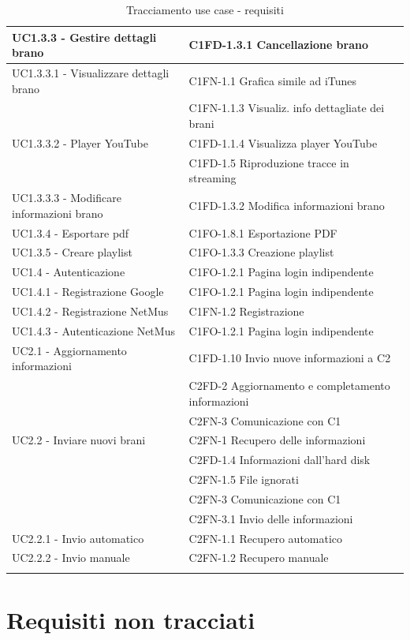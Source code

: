\begin{footnotesize}
\begin{longtable}[!h]{|l|l|}
UC1.3.3 - Gestire dettagli brano & C1FD-1.3.1 Cancellazione brano \\ \hline
UC1.3.3.1 - Visualizzare dettagli brano & C1FN-1.1 Grafica simile ad iTunes \\
& C1FN-1.1.3 Visualiz. info dettagliate dei brani \\ \hline
UC1.3.3.2 - Player YouTube & C1FD-1.1.4 Visualizza player YouTube \\
& C1FD-1.5 Riproduzione tracce in streaming \\ \hline
UC1.3.3.3 - Modificare informazioni brano & C1FD-1.3.2 Modifica informazioni
brano \\ \hline
UC1.3.4 - Esportare pdf & C1FO-1.8.1 Esportazione PDF \\ \hline
UC1.3.5 - Creare playlist & C1FO-1.3.3 Creazione playlist \\ \hline 
UC1.4 - Autenticazione & C1FO-1.2.1 Pagina login indipendente \\ \hline
UC1.4.1 - Registrazione Google & C1FO-1.2.1 Pagina login indipendente \\ \hline
UC1.4.2 - Registrazione NetMus & C1FN-1.2 Registrazione \\ \hline
UC1.4.3  - Autenticazione NetMus & C1FO-1.2.1 Pagina login indipendente \\
\hline
UC2.1 - Aggiornamento informazioni & C1FD-1.10 Invio nuove informazioni a C2 \\
& C2FD-2 Aggiornamento e completamento informazioni \\
& C2FN-3 Comunicazione con C1 \\ \hline
UC2.2 - Inviare nuovi brani & C2FN-1 Recupero delle informazioni \\
& C2FD-1.4 Informazioni dall'hard disk \\
& C2FN-1.5 File ignorati \\
& C2FN-3 Comunicazione con C1 \\
& C2FN-3.1 Invio delle informazioni \\ \hline
UC2.2.1 - Invio automatico & C2FN-1.1 Recupero automatico \\ \hline
UC2.2.2 - Invio manuale & C2FN-1.2 Recupero manuale \\ \hline
\caption{Tracciamento use case - requisiti}
\end{longtable}
\end{footnotesize}

\newpage
\section{Requisiti non tracciati}

